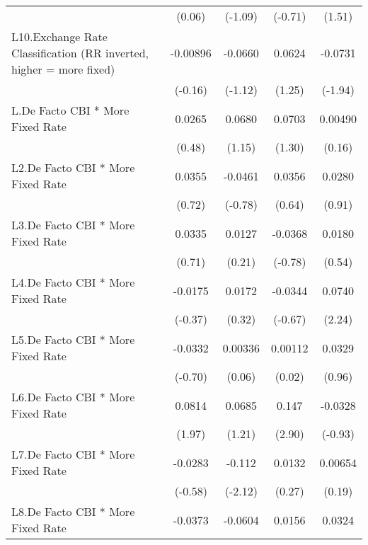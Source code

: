 {\begin{longtable}{l*{4}{c}}
                &   (0.06)         &  (-1.09)         &  (-0.71)         &   (1.51)         \\
[1em]
L10.Exchange Rate Classification (RR inverted, higher = more fixed)& -0.00896         &  -0.0660         &   0.0624         &  -0.0731         \\
                &  (-0.16)         &  (-1.12)         &   (1.25)         &  (-1.94)         \\
[1em]
L.De Facto CBI * More Fixed Rate&   0.0265         &   0.0680         &   0.0703         &  0.00490         \\
                &   (0.48)         &   (1.15)         &   (1.30)         &   (0.16)         \\
[1em]
L2.De Facto CBI * More Fixed Rate&   0.0355         &  -0.0461         &   0.0356         &   0.0280         \\
                &   (0.72)         &  (-0.78)         &   (0.64)         &   (0.91)         \\
[1em]
L3.De Facto CBI * More Fixed Rate&   0.0335         &   0.0127         &  -0.0368         &   0.0180         \\
                &   (0.71)         &   (0.21)         &  (-0.78)         &   (0.54)         \\
[1em]
L4.De Facto CBI * More Fixed Rate&  -0.0175         &   0.0172         &  -0.0344         &   0.0740\sym{*}  \\
                &  (-0.37)         &   (0.32)         &  (-0.67)         &   (2.24)         \\
[1em]
L5.De Facto CBI * More Fixed Rate&  -0.0332         &  0.00336         &  0.00112         &   0.0329         \\
                &  (-0.70)         &   (0.06)         &   (0.02)         &   (0.96)         \\
[1em]
L6.De Facto CBI * More Fixed Rate&   0.0814\sym{*}  &   0.0685         &    0.147\sym{**} &  -0.0328         \\
                &   (1.97)         &   (1.21)         &   (2.90)         &  (-0.93)         \\
[1em]
L7.De Facto CBI * More Fixed Rate&  -0.0283         &   -0.112\sym{*}  &   0.0132         &  0.00654         \\
                &  (-0.58)         &  (-2.12)         &   (0.27)         &   (0.19)         \\
[1em]
L8.De Facto CBI * More Fixed Rate&  -0.0373         &  -0.0604         &   0.0156         &   0.0324         \\

\end{longtable}}
